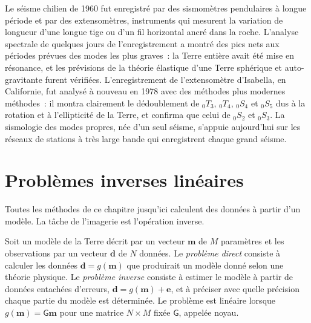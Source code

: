 \begin{history}
Le séisme chilien de 1960 fut enregistré par des sismomètres pendulaires à longue période
et par des extensomètres, instruments qui mesurent la variation de longueur
d'une longue tige ou d'un fil horizontal ancré dans la roche. L'analyse spectrale de quelques jours de
l'enregistrement a montré des pics nets aux périodes prévues des modes les plus graves~: la
Terre entière avait été mise en résonance, et les prévisions de la théorie élastique
d'une Terre sphérique et auto-gravitante furent vérifiées. L'enregistrement de l'extensomètre
d'Isabella, en Californie, fut analysé à nouveau en 1978 avec des méthodes plus modernes
méthodes~: il montra clairement le dédoublement de ${}_0T_3$, ${}_0T_4$, ${}_0S_4$
et ${}_0S_5$ dus à la rotation et à l'ellipticité de la Terre, et confirma que
celui de ${}_0S_2$ et ${}_0S_3$.
La sismologie des modes propres, née d'un seul séisme, s'appuie aujourd'hui sur les réseaux
de stations à très large bande qui enregistrent chaque grand séisme.
\end{history}

\section{Problèmes inverses linéaires}\label{sec:b3:seismology-imaging:inverse}

Toutes les méthodes de ce chapitre jusqu'ici calculent des données à partir d'un modèle. La tâche de
l'imagerie est l'opération inverse.

\begin{definition}\label{def:b3:seismology-imaging:inverse}
Soit un modèle de la Terre décrit par un vecteur $\mathbf m$ de $M$ paramètres
et les observations par un vecteur $\mathbf d$ de $N$ données. Le \emph{problème
direct} consiste à calculer les données $\mathbf d = g(\mathbf m)$
que produirait un modèle donné selon une théorie physique. Le \emph{problème
inverse} consiste à estimer le modèle à partir de données entachées
d'erreurs, $\mathbf d = g(\mathbf m) + \mathbf e$, et à préciser avec quelle précision chaque partie
du modèle est déterminée. Le problème est linéaire lorsque $g(\mathbf m) =
\mathsf G\mathbf m$ pour une matrice $N\times M$ fixée $\mathsf G$, appelée noyau.
\end{definition}


